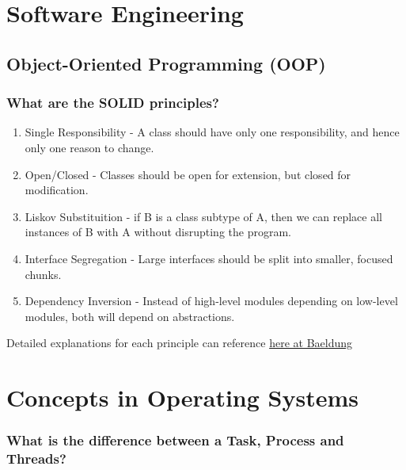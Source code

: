 \documentclass[12pt, a4paper]{article}
\begin{document}
\noindent

\tableofcontents

\pagebreak

\section*{Software Engineering}

\subsection*{Object-Oriented Programming (OOP)}

\subsubsection*{What are the SOLID principles?}
\begin{enumerate}
  \item Single Responsibility - A class should have only one responsibility, and hence only one reason to change.
  \item Open/Closed - Classes should be open for extension, but closed for modification.
  \item Liskov Substituition - if B is a class subtype of A, then we can replace all instances of B with A without disrupting the program.
  \item Interface Segregation - Large interfaces should be split into smaller, focused chunks.
  \item Dependency Inversion - Instead of high-level modules depending on low-level modules, both will depend on abstractions.
\end{enumerate}

Detailed explanations for each principle can reference \href{https://www.baeldung.com/solid-principles}{here at Baeldung}

\pagebreak
\section*{Concepts in Operating Systems}
\subsubsection*{What is the difference between a Task, Process and Threads?}
\end{document}
